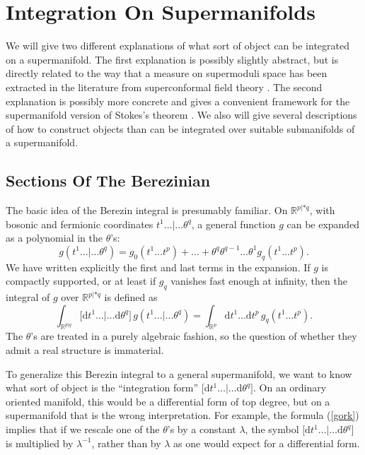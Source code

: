 \documentclass[11pt,a4paper]{article}
\def\d{{\mathrm d}}
\def\R{{\mathbb R}}
\def\[{\bigl [}
\def\]{\bigr ]}
\begin{document}
\section{Integration On Supermanifolds}\label{superintegration}

We will give two different explanations of what sort of object can be integrated on a supermanifold.  The first explanation is possibly
slightly abstract, but is directly related to the way that a measure on supermoduli space has been extracted in the literature from superconformal
field theory \cite{MNP,EHVerl,superoperator,DPh}.  The second explanation is possibly more concrete and gives a convenient framework for  the supermanifold
version of Stokes's theorem \cite{BL}.  We also will give several descriptions of how to construct objects than can be integrated over suitable submanifolds
of a supermanifold.

\subsection{Sections Of The Berezinian}\label{secber}

The basic idea of the Berezin integral is presumably familiar.  On $\R^{p|*q}$, with bosonic and fermionic coordinates $t^1\dots|\dots\theta^q$, a general
function $g$ can be expanded as a polynomial in the $\theta$'s:
\begin{equation}\label{gork}g(t^1\dots|\dots\theta^q)=g_0(t^1\dots t^p)+\dots+\theta^q\theta^{q-1}\dots\theta^1 g_q(t^1\dots t^p).\end{equation}
We have written explicitly the first and last terms in the expansion.
If $g$ is compactly supported, or at least if  $g_q$  vanishes fast enough at infinity, then the integral of $g$ over $\R^{p|*q}$ is defined as 
\begin{equation}\label{helmbo}\int_{\R^{p|q}}\[\d t^1\dots |\dots\d\theta^q\]  \,g(t^1\dots|\dots\theta^q)=\int_{\R^p}\d t^1\dots\d t^p \,g_q(t^1\dots t^p).
\end{equation}
The $\theta$'s are treated in a purely algebraic fashion, so the question of whether they admit a real structure is immaterial.

To generalize this Berezin integral to a general supermanifold, we want to know what sort of object
 is the ``integration form'' $\[\d t^1\dots|\dots \d\theta^q\]$.  On an ordinary oriented manifold, this would be a differential
form of top degree, but on a supermanifold that is the wrong interpretation.  For example, the formula (\ref{gork}) implies
that if we rescale one of the $\theta$'s by a constant $\lambda$, the symbol $\[\d t^1\dots|\dots\d\theta^q\]$ is multiplied by $\lambda^{-1}$,
rather than by $\lambda$ as one would expect for a differential form.    
\end{document}
